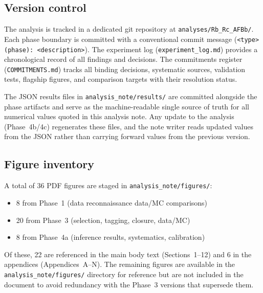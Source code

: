 \documentclass[11pt,a4paper]{article}
\begin{document}
\subsection{Version control}

The analysis is tracked in a dedicated git repository at
\texttt{analyses/Rb\_Rc\_AFBb/}. Each phase boundary is committed with a
conventional commit message (\texttt{<type>(phase): <description>}). The
experiment log (\texttt{experiment\_log.md}) provides a chronological record
of all findings and decisions. The commitments register (\texttt{COMMITMENTS.md})
tracks all binding decisions, systematic sources, validation tests, flagship
figures, and comparison targets with their resolution status.

The JSON results files in \texttt{analysis\_note/results/} are committed alongside
the phase artifacts and serve as the machine-readable single source of truth for
all numerical values quoted in this analysis note. Any update to the analysis
(Phase~4b/4c) regenerates these files, and the note writer reads updated values
from the JSON rather than carrying forward values from the previous version.

\subsection{Figure inventory}

A total of 36 PDF figures are staged in \texttt{analysis\_note/figures/}:
\begin{itemize}
\item 8 from Phase~1 (data reconnaissance data/MC comparisons)
\item 20 from Phase~3 (selection, tagging, closure, data/MC)
\item 8 from Phase~4a (inference results, systematics, calibration)
\end{itemize}

Of these, 22 are referenced in the main body text (Sections~1--12) and 6 in
the appendices (Appendices~A--N). The remaining figures are available in the
\texttt{analysis\_note/figures/} directory for reference but are not included
in the document to avoid redundancy with the Phase~3 versions that supersede them.
\end{document}
